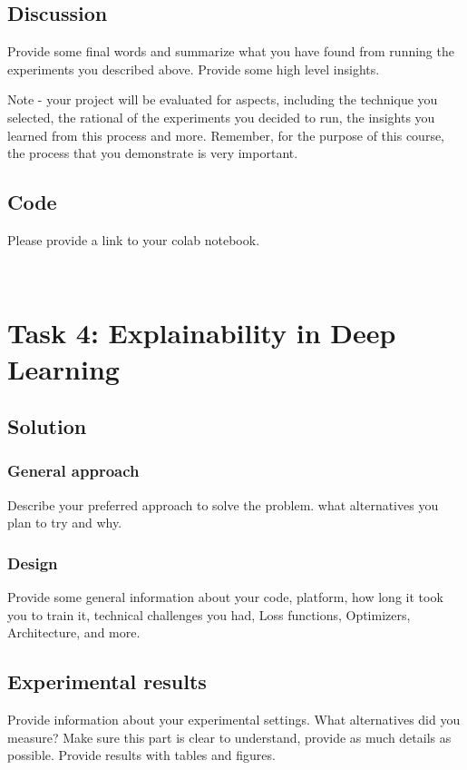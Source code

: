 \documentclass{article}
\begin{document}
\subsection{Discussion}
Provide some final words and summarize what you have found from running the experiments you described above. Provide some high level insights.

Note - your project will be evaluated for aspects, including the technique you selected, the rational of the experiments you decided to run, the insights you learned from this process and more. Remember, for the purpose of this course, the process that you demonstrate is very  important.

\subsection{Code}

Please provide a link to your colab notebook.


\
\section{Task 4: Explainability in Deep Learning}

\subsection{Solution}
\subsubsection{General approach}
Describe your preferred approach to solve the problem. what alternatives you plan to try and why. 

\subsubsection{Design}
Provide some general information about your code, platform, how long it took you to train it, technical challenges you had, Loss functions, Optimizers, Architecture, and more.

\subsection{Experimental results}
Provide information about your experimental settings. What alternatives did you measure? Make sure this part is clear to understand, provide as much details as possible. Provide results with tables and figures.
\end{document}

